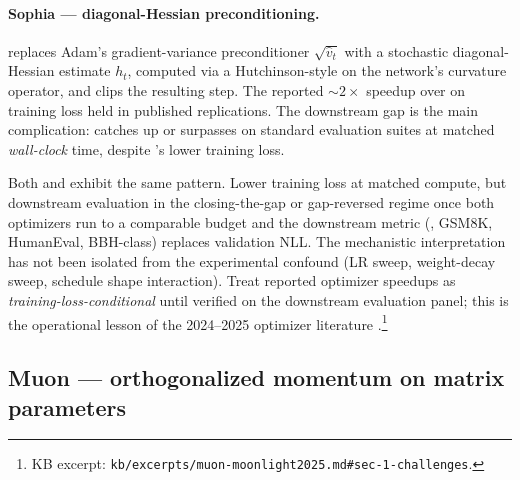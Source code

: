 \paragraph{Sophia --- diagonal-Hessian preconditioning.}
 \citep[Liu, Li et al.\ 2023, ICLR
2024]{muon-moonlight2025} replaces Adam's gradient-variance preconditioner
$\sqrt{\hat{v}_t}$ with a stochastic diagonal-Hessian estimate
$h_t$, computed via a Hutchinson-style  on the network's curvature
operator, and clips the resulting step. The reported $\sim\!2\times$
speedup over  on training loss held in published replications.
The downstream gap is the main complication:  catches up
or surpasses  on standard evaluation suites at matched
\emph{wall-clock} time, despite 's lower training loss.

\begin{contradiction}
\label{contra:opt-loss-vs-downstream}
Both  and  exhibit the same pattern. Lower training loss at
matched compute, but downstream evaluation in the closing-the-gap or
gap-reversed regime once both optimizers run to a comparable budget
and the downstream metric (, GSM8K, HumanEval, BBH-class)
replaces validation NLL. The mechanistic interpretation has not been
isolated from the experimental confound (LR sweep, weight-decay
sweep, schedule shape interaction). Treat reported optimizer
speedups as \emph{training-loss-conditional} until verified on the
downstream evaluation panel; this is the operational lesson of the
2024--2025  optimizer literature
\citep[\S 1]{muon-moonlight2025}.\protect\footnote{KB excerpt:
\nolinkurl{kb/excerpts/muon-moonlight2025.md#sec-1-challenges}.}
\end{contradiction}

\subsection{Muon --- orthogonalized momentum on matrix parameters}
\label{sec:opt-muon}

